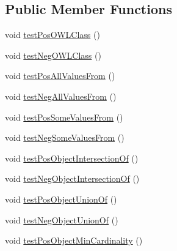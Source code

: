 \subsection*{Public Member Functions}
\begin{DoxyCompactItemize}
\item 
void \hyperlink{classorg_1_1semanticweb_1_1owlapi_1_1api_1_1test_1_1axioms_1_1_n_n_f_test_case_ac83468e2a6b9928a032259198c697954}{test\-Pos\-O\-W\-L\-Class} ()
\item 
void \hyperlink{classorg_1_1semanticweb_1_1owlapi_1_1api_1_1test_1_1axioms_1_1_n_n_f_test_case_a97cce1b9814e79f19de4c7fc9efecbc3}{test\-Neg\-O\-W\-L\-Class} ()
\item 
void \hyperlink{classorg_1_1semanticweb_1_1owlapi_1_1api_1_1test_1_1axioms_1_1_n_n_f_test_case_a1ed7987f521b9a806197c1e11ad2dfcc}{test\-Pos\-All\-Values\-From} ()
\item 
void \hyperlink{classorg_1_1semanticweb_1_1owlapi_1_1api_1_1test_1_1axioms_1_1_n_n_f_test_case_a213aacf16e8d5ddd443f4da50919bc95}{test\-Neg\-All\-Values\-From} ()
\item 
void \hyperlink{classorg_1_1semanticweb_1_1owlapi_1_1api_1_1test_1_1axioms_1_1_n_n_f_test_case_adc9b5463eb777c7a31f9153666fa4f1d}{test\-Pos\-Some\-Values\-From} ()
\item 
void \hyperlink{classorg_1_1semanticweb_1_1owlapi_1_1api_1_1test_1_1axioms_1_1_n_n_f_test_case_a8f08c42d1118573ab0c77a2f1201a768}{test\-Neg\-Some\-Values\-From} ()
\item 
void \hyperlink{classorg_1_1semanticweb_1_1owlapi_1_1api_1_1test_1_1axioms_1_1_n_n_f_test_case_a5c79a1ee16963233a73ea4b7efcc38a9}{test\-Pos\-Object\-Intersection\-Of} ()
\item 
void \hyperlink{classorg_1_1semanticweb_1_1owlapi_1_1api_1_1test_1_1axioms_1_1_n_n_f_test_case_a6e3b947ec6c83c21db55b0cbcf649b58}{test\-Neg\-Object\-Intersection\-Of} ()
\item 
void \hyperlink{classorg_1_1semanticweb_1_1owlapi_1_1api_1_1test_1_1axioms_1_1_n_n_f_test_case_ad7fcd03a28ff6237029db28d462f9bf1}{test\-Pos\-Object\-Union\-Of} ()
\item 
void \hyperlink{classorg_1_1semanticweb_1_1owlapi_1_1api_1_1test_1_1axioms_1_1_n_n_f_test_case_ab37f2525f9ee25269f877b7662b9017c}{test\-Neg\-Object\-Union\-Of} ()
\item 
void \hyperlink{classorg_1_1semanticweb_1_1owlapi_1_1api_1_1test_1_1axioms_1_1_n_n_f_test_case_ab73510ddc1bd5170a01d951be4e78e12}{test\-Pos\-Object\-Min\-Cardinality} ()
\item 

\end{DoxyCompactItemize}
